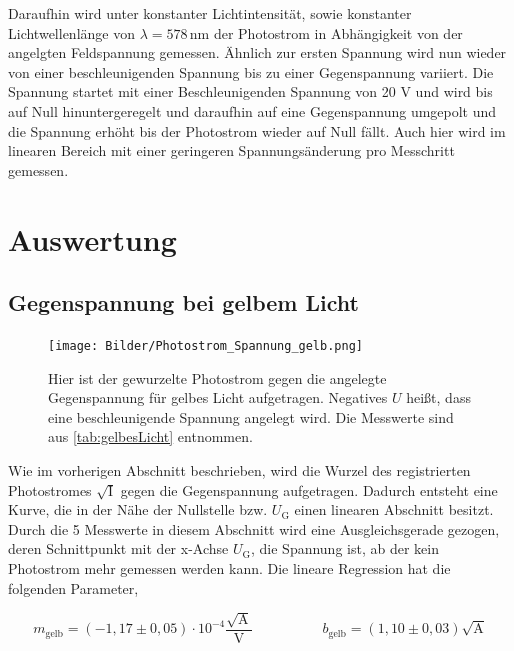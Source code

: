 \documentclass[titlepage = firstcover]{scrartcl}
\begin{document}
            \noindent
            Daraufhin wird unter konstanter Lichtintensität, sowie konstanter Lichtwellenlänge von $\lambda = 578 \, \text{nm}$ der Photostrom in Abhängigkeit von der angelgten Feldspannung gemessen.
            Ähnlich zur ersten Spannung wird nun wieder von einer beschleunigenden Spannung bis zu einer Gegenspannung variiert. Die Spannung startet mit einer Beschleunigenden Spannung von 20 V und 
            wird bis auf Null hinuntergeregelt und daraufhin auf eine Gegenspannung umgepolt und die Spannung erhöht bis der Photostrom wieder auf Null fällt. Auch hier wird im linearen Bereich mit 
            einer geringeren Spannungsänderung pro Messchritt gemessen.
    
    \newpage
    \section{Auswertung}
        \subsection{Gegenspannung bei gelbem Licht} \label{sec:gegenspannung_gelb}
            \begin{figure}[h]
              \centering
              \texttt{[image: Bilder/Photostrom\_Spannung\_gelb.png]}
              \caption{Hier ist der gewurzelte Photostrom gegen die angelegte Gegenspannung für gelbes Licht aufgetragen. Negatives $U$ heißt, dass eine beschleunigende Spannung angelegt wird. Die Messwerte sind aus \autoref{tab:gelbesLicht} entnommen.}
              \label{fig:gelbesLicht}
            \end{figure}

            \FloatBarrier
            
            Wie im vorherigen Abschnitt beschrieben, wird die Wurzel des registrierten Photostromes $\sqrt{\text{I}}$ gegen die Gegenspannung aufgetragen.
            Dadurch entsteht eine Kurve, die in der Nähe der Nullstelle bzw. $U_\text{G}$ einen linearen Abschnitt besitzt.
            Durch die 5 Messwerte in diesem Abschnitt wird eine Ausgleichsgerade gezogen, deren Schnittpunkt mit der x-Achse $U_\text{G}$, die Spannung ist, ab der kein Photostrom mehr gemessen werden kann.
            Die lineare Regression hat die folgenden Parameter,

            \begin{equation*}
              m_{\text{gelb}} = (-1,17 \pm 0,05) \cdot 10^{-4} \frac{\sqrt{\text{A}}}{\text{V}} \qquad \quad \qquad b_{\text{gelb}} = (1,10 \pm 0,03) \sqrt{\text{A}}
            \end{equation*}
\end{document}
